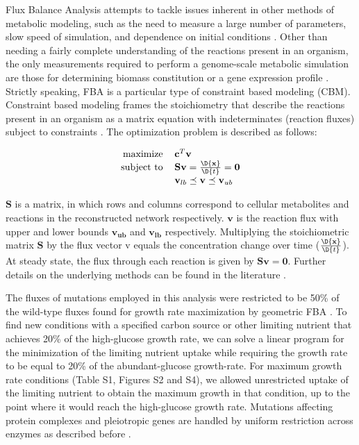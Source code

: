 Flux Balance Analysis attempts to tackle issues inherent in other
methods of metabolic modeling, such as the need to measure a large
number of parameters, slow speed of simulation, and dependence on
initial conditions \citep{Orth2010, Schellenberger2011a}. 
Other than needing a fairly complete
understanding of the reactions present in an organism, the only
measurements required to perform a genome-scale metabolic simulation
are those for determining biomass constitution or a gene expression
profile \citep{Shlomi2005, Mo2009}. Strictly speaking, FBA is a particular type of
constraint based modeling (CBM). Constraint based modeling frames the
stoichiometry that describe the reactions present in an organism as a
matrix equation with indeterminates (reaction fluxes) subject to
constraints \citep{Smallbone2009a, Mo2009}. The optimization problem
is described as follows:


\begin{equation}
\centering
\begin{tabular}{rl}
maximize   & $\mathbf{c}^T\mathbf{v}$                                     \\
subject to & $\mathbf{S v} = \frac{\D{\mathbf{x}}}{\D{t}} = \mathbf{0}$   \\
           & $\mathbf{v}_{lb} \preceq \mathbf{v} \preceq \mathbf{v}_{ub}$ \\
\end{tabular}
\end{equation}

$\mathbf{S}$ is a matrix, in which rows and columns correspond to
cellular metabolites and reactions in the reconstructed network
respectively. $\mathbf{v}$ is the reaction flux with upper and lower
bounds $\mathbf{v_{ub}}$ and $\mathbf{v_{lb}}$
respectively. Multiplying the stoichiometric matrix $\mathbf{S}$ by
the flux vector v equals the concentration change over time
($\frac{\D{\mathbf{x}}}{\D{t}}$). At steady state, the flux through
each reaction is given by $\mathbf{Sv} = \mathbf{0}$. Further details
on the underlying methods can be found in the literature 
\citep{Xu2012, Smallbone2009a, He2010}.

The fluxes of mutations employed in this analysis were restricted to
be 50\% of the wild-type fluxes found for growth rate maximization by
geometric FBA \citep{He2010}. To find new conditions with a specified carbon
source or other limiting nutrient that achieves 20\% of the
high-glucose growth rate, we can solve a linear program for the
minimization of the limiting nutrient uptake while requiring the
growth rate to be equal to 20\% of the abundant-glucose
growth-rate. For maximum growth rate conditions (Table S1, Figures S2
and S4), we allowed unrestricted uptake of the limiting nutrient to
obtain the maximum growth in that condition, up to the point where it
would reach the high-glucose growth rate. Mutations affecting protein
complexes and pleiotropic genes are handled by uniform restriction
across enzymes as described before \citep{Xu2012}.

